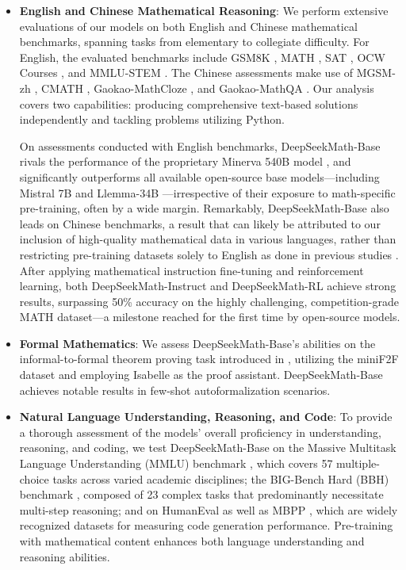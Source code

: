 \begin{itemize}[topsep=0pt]
    \item \textbf{English and Chinese Mathematical Reasoning}: We perform extensive evaluations of our models on both English and Chinese mathematical benchmarks, spanning tasks from elementary to collegiate difficulty. For English, the evaluated benchmarks include GSM8K \citep{gsm8k}, MATH \citep{MATH}, SAT \citep{llemma}, OCW Courses \citep{minerva}, and MMLU-STEM \citep{mmlu}. The Chinese assessments make use of MGSM-zh \citep{mgsm}, CMATH \citep{wei2023cmath}, Gaokao-MathCloze \citep{agieval}, and Gaokao-MathQA \citep{agieval}. Our analysis covers two capabilities: producing comprehensive text-based solutions independently and tackling problems utilizing Python.

On assessments conducted with English benchmarks, DeepSeekMath-Base rivals the performance of the proprietary Minerva 540B model \citep{minerva}, and significantly outperforms all available open-source base models—including Mistral 7B \citep{mistral} and Llemma-34B \citep{llemma}—irrespective of their exposure to math-specific pre-training, often by a wide margin. Remarkably, DeepSeekMath-Base also leads on Chinese benchmarks, a result that can likely be attributed to our inclusion of high-quality mathematical data in various languages, rather than restricting pre-training datasets solely to English as done in previous studies \citep{minerva,llemma}. After applying mathematical instruction fine-tuning and reinforcement learning, both DeepSeekMath-Instruct and DeepSeekMath-RL achieve strong results, surpassing 50\% accuracy on the highly challenging, competition-grade MATH dataset—a milestone reached for the first time by open-source models.

\item \textbf{Formal Mathematics}: We assess DeepSeekMath-Base's abilities on the informal-to-formal theorem proving task introduced in \citep{dsp_proof}, utilizing the miniF2F dataset \citep{minif2f} and employing Isabelle \citep{isabelle} as the proof assistant. DeepSeekMath-Base achieves notable results in few-shot autoformalization scenarios.
\item \textbf{Natural Language Understanding, Reasoning, and Code}: To provide a thorough assessment of the models' overall proficiency in understanding, reasoning, and coding, we test DeepSeekMath-Base on the Massive Multitask Language Understanding (MMLU) benchmark \citep{mmlu}, which covers 57 multiple-choice tasks across varied academic disciplines; the BIG-Bench Hard (BBH) benchmark \citep{bbh}, composed of 23 complex tasks that predominantly necessitate multi-step reasoning; and on HumanEval \citep{codex} as well as MBPP \citep{mbpp}, which are widely recognized datasets for measuring code generation performance. Pre-training with mathematical content enhances both language understanding and reasoning abilities.


\end{itemize}
